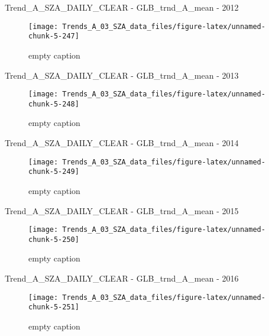 \documentclass[
  10pt,
  a4paper,oneside]{article}
\begin{document}
Trend\_A\_SZA\_DAILY\_CLEAR - GLB\_trnd\_A\_mean - 2012

\begin{figure}[!ht]

{\centering \texttt{[image: Trends\_A\_03\_SZA\_data\_files/figure-latex/unnamed-chunk-5-247]} 

}

\caption{ empty caption }\label{fig:unnamed-chunk-5-247}
\end{figure}

Trend\_A\_SZA\_DAILY\_CLEAR - GLB\_trnd\_A\_mean - 2013

\begin{figure}[!ht]

{\centering \texttt{[image: Trends\_A\_03\_SZA\_data\_files/figure-latex/unnamed-chunk-5-248]} 

}

\caption{ empty caption }\label{fig:unnamed-chunk-5-248}
\end{figure}

Trend\_A\_SZA\_DAILY\_CLEAR - GLB\_trnd\_A\_mean - 2014

\begin{figure}[!ht]

{\centering \texttt{[image: Trends\_A\_03\_SZA\_data\_files/figure-latex/unnamed-chunk-5-249]} 

}

\caption{ empty caption }\label{fig:unnamed-chunk-5-249}
\end{figure}

Trend\_A\_SZA\_DAILY\_CLEAR - GLB\_trnd\_A\_mean - 2015

\begin{figure}[!ht]

{\centering \texttt{[image: Trends\_A\_03\_SZA\_data\_files/figure-latex/unnamed-chunk-5-250]} 

}

\caption{ empty caption }\label{fig:unnamed-chunk-5-250}
\end{figure}

Trend\_A\_SZA\_DAILY\_CLEAR - GLB\_trnd\_A\_mean - 2016

\begin{figure}[!ht]

{\centering \texttt{[image: Trends\_A\_03\_SZA\_data\_files/figure-latex/unnamed-chunk-5-251]} 

}

\caption{ empty caption }\label{fig:unnamed-chunk-5-251}
\end{figure}
\end{document}
